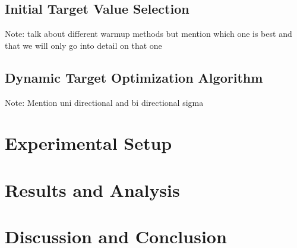 \documentclass[12pt,fleqn,a4paper]{article}
\begin{document}
\subsection{Initial Target Value Selection}
Note: talk about different warmup methods but mention which one is best and that we will only go into detail on that one

\subsection{Dynamic Target Optimization Algorithm}
Note: Mention uni directional and bi directional sigma

\section{Experimental Setup}

\section{Results and Analysis}

\section{Discussion and Conclusion}

\newpage
\end{document}

